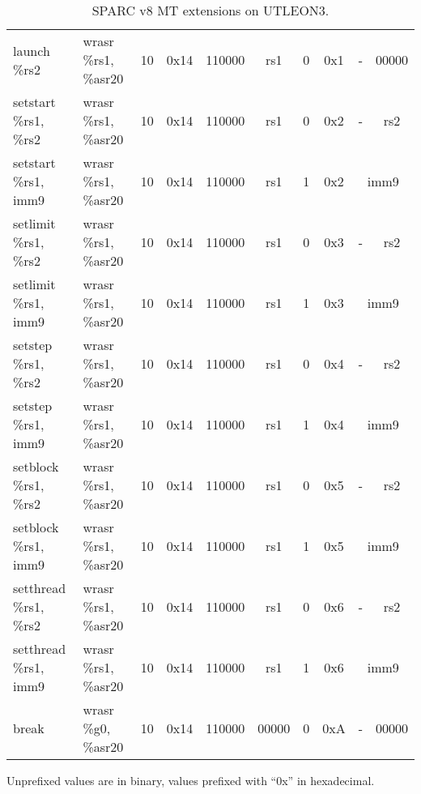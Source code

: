 \documentclass[a4paper,11pt]{article}
\newcommand{\leon}{UTLEON3}
\begin{document}
\begin{table}
\begin{center}
{\begin{tabular}{|>{\ttfamily}l|>{\ttfamily}l||c|c|c|c|c|c|c|c|}
\hline \hline
launch \%rs2           & wrasr \%rs1, \%asr20 & 10 & 0x14 & 110000 &  rs1 & 0 & 0x1 & - & 00000 \\
setstart  \%rs1, \%rs2 & wrasr \%rs1, \%asr20 & 10 & 0x14 & 110000 &  rs1 & 0 & 0x2 & - & rs2 \\ \cline{9-10}
setstart  \%rs1,  imm9 & wrasr \%rs1, \%asr20 & 10 & 0x14 & 110000 &  rs1 & 1 & 0x2 & \multicolumn{2}{c|}{imm9} \\ \cline{9-10}
setlimit  \%rs1, \%rs2 & wrasr \%rs1, \%asr20 & 10 & 0x14 & 110000 &  rs1 & 0 & 0x3 & - & rs2 \\ \cline{9-10}
setlimit  \%rs1,  imm9 & wrasr \%rs1, \%asr20 & 10 & 0x14 & 110000 &  rs1 & 1 & 0x3 & \multicolumn{2}{c|}{imm9} \\ \cline{9-10}
setstep   \%rs1, \%rs2 & wrasr \%rs1, \%asr20 & 10 & 0x14 & 110000 &  rs1 & 0 & 0x4 & - & rs2 \\ \cline{9-10}
setstep   \%rs1,  imm9 & wrasr \%rs1, \%asr20 & 10 & 0x14 & 110000 &  rs1 & 1 & 0x4 & \multicolumn{2}{c|}{imm9} \\ \cline{9-10}
setblock  \%rs1, \%rs2 & wrasr \%rs1, \%asr20 & 10 & 0x14 & 110000 &  rs1 & 0 & 0x5 & - & rs2 \\ \cline{9-10}
setblock  \%rs1,  imm9 & wrasr \%rs1, \%asr20 & 10 & 0x14 & 110000 &  rs1 & 1 & 0x5 & \multicolumn{2}{c|}{imm9} \\ \cline{9-10}
setthread \%rs1, \%rs2 & wrasr \%rs1, \%asr20 & 10 & 0x14 & 110000 &  rs1 & 0 & 0x6 & - & rs2 \\ \cline{9-10}
setthread \%rs1,  imm9 & wrasr \%rs1, \%asr20 & 10 & 0x14 & 110000 &  rs1 & 1 & 0x6 & \multicolumn{2}{c|}{imm9} \\ \cline{9-10}
break                  & wrasr \%g0, \%asr20  & 10 & 0x14 & 110000 & 00000 & 0 & 0xA & - & 00000 \\
\hline
\end{tabular}
\caption{SPARC v8 MT extensions on \leon.}

Unprefixed values are in binary, values prefixed with ``0x'' in hexadecimal.}
\end{center}
\end{table}
\end{document}

